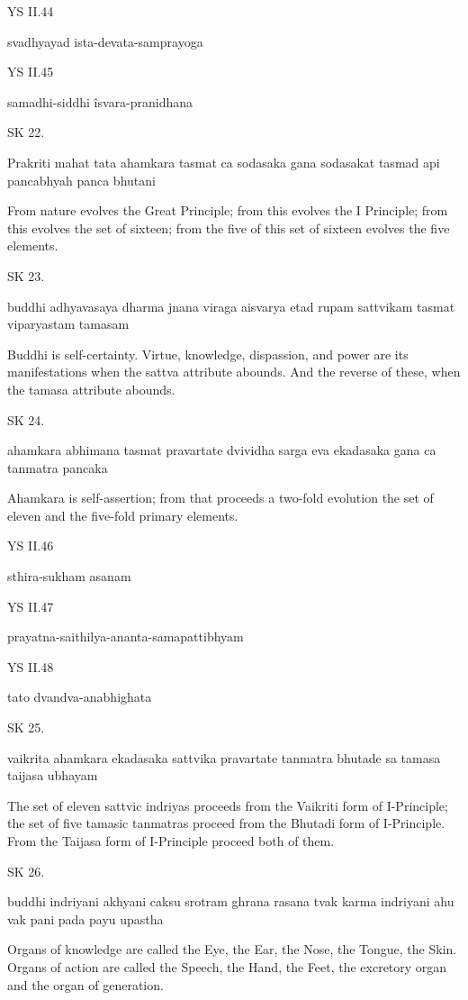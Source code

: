 YS II.44

svadhyayad ista-devata-samprayoga

YS II.45

samadhi-siddhi îsvara-pranidhana

SK 22.

Prakriti mahat tata ahamkara tasmat ca sodasaka gana
sodasakat tasmad api pancabhyah panca bhutani

From nature evolves the Great Principle;
from this evolves the I Principle;
from this evolves the set of sixteen;
from the five of this set of sixteen evolves the five elements.

SK 23.

buddhi adhyavasaya dharma jnana viraga aisvarya
etad rupam sattvikam tasmat viparyastam tamasam

Buddhi is self-certainty.
Virtue, knowledge, dispassion, and power are its manifestations
when the sattva attribute abounds.
And the reverse of these, when the tamasa attribute abounds.

SK 24.

ahamkara abhimana tasmat pravartate dvividha sarga eva
ekadasaka gana ca tanmatra pancaka

Ahamkara is self-assertion;
from that proceeds a two-fold evolution
the set of eleven and the five-fold primary elements.

YS II.46

sthira-sukham asanam

YS II.47

prayatna-saithilya-ananta-samapattibhyam

YS II.48

tato dvandva-anabhighata

SK 25.

vaikrita ahamkara ekadasaka sattvika pravartate
tanmatra bhutade sa tamasa taijasa ubhayam

The set of eleven sattvic indriyas proceeds from the Vaikriti form of I-Principle;
the set of five tamasic tanmatras proceed from the Bhutadi form of I-Principle.
From the Taijasa form of I-Principle proceed both of them.

SK 26.

buddhi indriyani akhyani caksu srotram ghrana rasana tvak
karma indriyani ahu vak pani pada payu upastha

Organs of knowledge are called the Eye, the Ear, the Nose, the Tongue, the Skin.
Organs of action are called the Speech, the Hand, the Feet, the excretory organ and the organ of generation.

